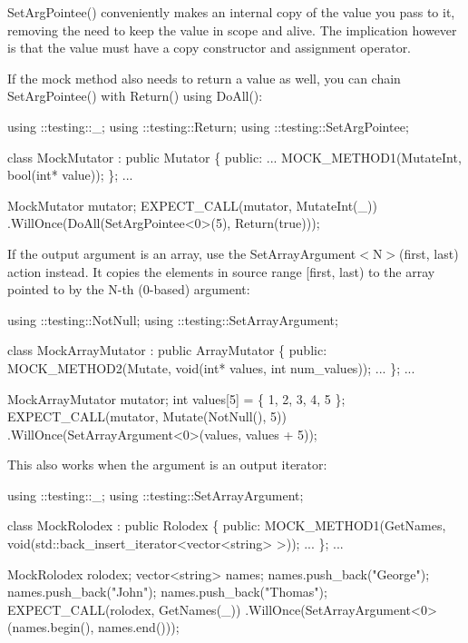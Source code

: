 {\ttfamily Set\+Arg\+Pointee()} conveniently makes an internal copy of the value you pass to it, removing the need to keep the value in scope and alive. The implication however is that the value must have a copy constructor and assignment operator.

If the mock method also needs to return a value as well, you can chain {\ttfamily Set\+Arg\+Pointee()} with {\ttfamily Return()} using {\ttfamily Do\+All()}\+:


\begin{DoxyCode}
using ::testing::\_;
using ::testing::Return;
using ::testing::SetArgPointee;

\textcolor{keyword}{class }MockMutator : \textcolor{keyword}{public} Mutator \{
 \textcolor{keyword}{public}:
  ...
  MOCK\_METHOD1(MutateInt, \textcolor{keywordtype}{bool}(\textcolor{keywordtype}{int}* value));
\};
...

  MockMutator mutator;
  EXPECT\_CALL(mutator, MutateInt(\_))
      .WillOnce(DoAll(SetArgPointee<0>(5),
                      Return(\textcolor{keyword}{true})));
\end{DoxyCode}


If the output argument is an array, use the {\ttfamily Set\+Array\+Argument$<$N$>$(first, last)} action instead. It copies the elements in source range {\ttfamily \mbox{[}first, last)} to the array pointed to by the {\ttfamily N}-\/th (0-\/based) argument\+:


\begin{DoxyCode}
using ::testing::NotNull;
using ::testing::SetArrayArgument;

\textcolor{keyword}{class }MockArrayMutator : \textcolor{keyword}{public} ArrayMutator \{
 \textcolor{keyword}{public}:
  MOCK\_METHOD2(Mutate, \textcolor{keywordtype}{void}(\textcolor{keywordtype}{int}* values, \textcolor{keywordtype}{int} num\_values));
  ...
\};
...

  MockArrayMutator mutator;
  \textcolor{keywordtype}{int} values[5] = \{ 1, 2, 3, 4, 5 \};
  EXPECT\_CALL(mutator, Mutate(NotNull(), 5))
      .WillOnce(SetArrayArgument<0>(values, values + 5));
\end{DoxyCode}


This also works when the argument is an output iterator\+:


\begin{DoxyCode}
using ::testing::\_;
using ::testing::SetArrayArgument;

\textcolor{keyword}{class }MockRolodex : \textcolor{keyword}{public} Rolodex \{
 \textcolor{keyword}{public}:
  MOCK\_METHOD1(GetNames, \textcolor{keywordtype}{void}(std::back\_insert\_iterator<vector<string> >));
  ...
\};
...

  MockRolodex rolodex;
  vector<string> names;
  names.push\_back(\textcolor{stringliteral}{"George"});
  names.push\_back(\textcolor{stringliteral}{"John"});
  names.push\_back(\textcolor{stringliteral}{"Thomas"});
  EXPECT\_CALL(rolodex, GetNames(\_))
      .WillOnce(SetArrayArgument<0>(names.begin(), names.end()));
\end{DoxyCode}



